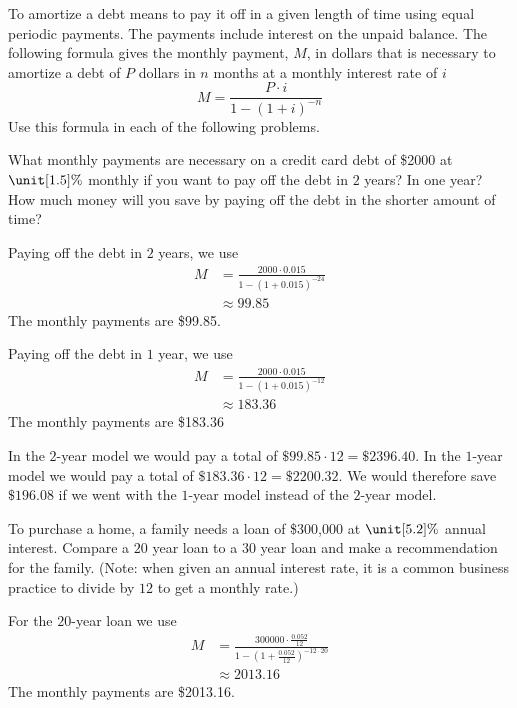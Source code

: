 	 \begin{problem}
	 To amortize a debt means to pay it off in a given length of time using
	 equal periodic payments. The payments include interest on the unpaid
	 balance. The following formula gives the monthly payment, $M$, in dollars
	 that is necessary to amortize a debt of $P$ dollars in $n$ months
	 at a monthly interest rate of $i$
	 \[
		 M=\frac{P\cdot i}{1-(1+i)^{-n}}
	 \]
	 Use this formula in each of the following problems.
	 \begin{subproblem}
		 What monthly payments are necessary on a credit card debt of \$2000 at
		 $\unit[1.5]{\%}$ monthly if you want to pay off the debt in $2$ years?
		 In one year? How much money will you save by paying off the debt in the
		 shorter amount of time?
		 \begin{shortsolution}
			 Paying off the debt in $2$ years, we use
			 \begin{align*}
				 M & = \frac{2000\cdot 0.015}{1-(1+0.015)^{-24}} \\
				   & \approx 99.85
			 \end{align*}
			 The monthly payments are \$99.85.

			 Paying off the debt in $1$ year, we use
			 \begin{align*}
				 M & = \frac{2000\cdot 0.015}{1-(1+0.015)^{-12}} \\
				   & \approx 183.36
			 \end{align*}
			 The monthly payments are \$183.36

			 In the $2$-year model we would pay a total of $\$99.85\cdot 12=\$2396.40$. In the
			 $1$-year model we would pay a total of $\$183.36\cdot 12=\$2200.32$. We would therefore
			 save $\$196.08$ if we went with the $1$-year model instead of the $2$-year model.
		 \end{shortsolution}
	 \end{subproblem}
	 \begin{subproblem}
		 To purchase a home, a family needs a loan of \$300,000 at $\unit[5.2]{\%}$
		 annual interest.  Compare a $20$ year loan to a $30$ year loan and make
		 a recommendation for the family.
		 (Note: when given an annual interest rate, it is a common business practice to divide by
		 $12$ to get a monthly rate.)
		 \begin{shortsolution}
			 For the $20$-year loan we use
			 \begin{align*}
				 M & = \frac{300000\cdot \frac{0.052}{12}}{1-\left( 1+\frac{0.052}{12} \right)^{-12\cdot 20}} \\
				   & \approx 2013.16
			 \end{align*}
			 The monthly payments are \$2013.16.


\end{shortsolution}
\end{subproblem}
\end{problem}
